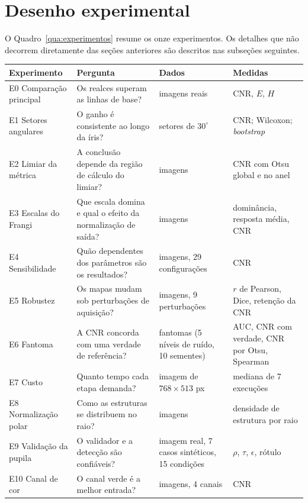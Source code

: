 \documentclass[12pt, oneside, a4paper, chapter=TITLE, section=TITLE,
               english, brazil]{abntex2}
\newcommand{\secao}[1]{\section[\texorpdfstring{\protect\MakeTextUppercase{#1}}{#1}]{#1}}
\begin{document}
\secao{Desenho experimental}
\label{sec:met-experimentos}

O Quadro~\ref{qua:experimentos} resume os onze experimentos. Os detalhes que
não decorrem diretamente das seções anteriores são descritos nas subseções
seguintes.

\begin{quadro}[htbp]
  \caption{Experimentos realizados, perguntas a que respondem e medidas
  empregadas}
  \label{qua:experimentos}
  \footnotesize
  \renewcommand{\arraystretch}{1.12}
  \begin{tabular}{|>{\raggedright\arraybackslash}p{2.5cm}
                  |>{\raggedright\arraybackslash}p{4.4cm}
                  |>{\raggedright\arraybackslash}p{3.3cm}
                  |>{\raggedright\arraybackslash}p{3.6cm}|}
    \hline
    \textbf{Experimento} & \textbf{Pergunta} & \textbf{Dados} &
      \textbf{Medidas} \\ \hline
    E0 Comparação principal & Os realces superam as linhas de base? &
      2 imagens reais & CNR, $E$, $H$ \\ \hline
    E1 Setores angulares & O ganho é consistente ao longo da íris? &
      24 setores de $30^\circ$ & CNR; Wilcoxon; \emph{bootstrap} \\ \hline
    E2 Limiar da métrica & A conclusão depende da região de cálculo do
      limiar? & 2 imagens & CNR com Otsu global e no anel \\ \hline
    E3 Escalas do Frangi & Que escala domina e qual o efeito da normalização
      de saída? & 2 imagens & dominância, resposta média, CNR \\ \hline
    E4 Sensibilidade & Quão dependentes dos parâmetros são os resultados? &
      2 imagens, 29 configurações & CNR \\ \hline
    E5 Robustez & Os mapas mudam sob perturbações de aquisição? & 2 imagens,
      9 perturbações & $r$ de Pearson, Dice, retenção da CNR \\ \hline
    E6 Fantoma & A CNR concorda com uma verdade de referência? &
      50 fantomas (5 níveis de ruído, 10 sementes) & AUC, CNR com verdade,
      CNR por Otsu, Spearman \\ \hline
    E7 Custo & Quanto tempo cada etapa demanda? & imagem de $768 \times 513$
      px & mediana de 7 execuções \\ \hline
    E8 Normalização polar & Como as estruturas se distribuem no raio? &
      2 imagens & densidade de estrutura por raio \\ \hline
    E9 Validação da pupila & O validador e a detecção são confiáveis? &
      imagem real, 7 casos sintéticos, 15 condições & $\rho$, $\tau$,
      $\epsilon$, rótulo \\ \hline
    E10 Canal de cor & O canal verde é a melhor entrada? & 2 imagens,
      4 canais & CNR \\ \hline
  \end{tabular}
\end{quadro}
\end{document}
